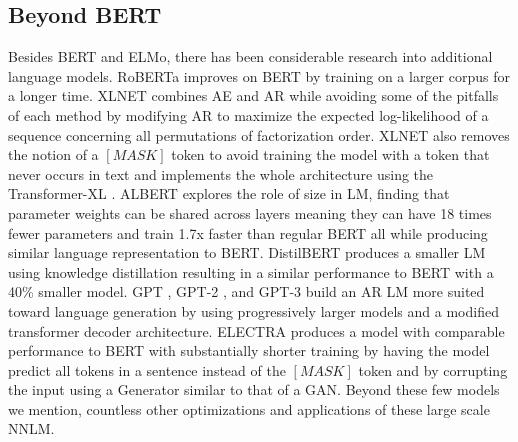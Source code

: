 \subsection{Beyond BERT}
\label{chap:prior:sec:lm:otherlm}
Besides BERT and ELMo, there has been considerable research into additional language models. RoBERTa \cite{Liu2019RoBERTaAR} improves on BERT by training on a larger corpus for a longer time. XLNET \cite{Yang2019XLNetGA} combines AE and AR while avoiding some of the pitfalls of each method by modifying AR to maximize the expected log-likelihood of a sequence concerning all permutations of factorization order. XLNET also removes the notion of a $[MASK]$ token to avoid training the model with a token that never occurs in text and implements the whole architecture using the Transformer-XL \cite{Dai2019TransformerXLAL}. ALBERT \cite{Lan2019ALBERTAL} explores the role of size in LM, finding that parameter weights can be shared across layers meaning they can have 18 times fewer parameters and train 1.7x faster than regular BERT all while producing similar language representation to BERT. DistilBERT \cite{Sanh2019DistilBERTAD} produces a smaller LM using knowledge distillation resulting in a similar performance to BERT with a 40\% smaller model. GPT \cite{Radford2018ImprovingLU}, GPT-2 \cite{Radford2019LanguageMA}, and GPT-3 \cite{Brown2020LanguageMA}  build an AR LM more suited toward language generation by using progressively larger models and a modified transformer decoder architecture. ELECTRA \cite{Clark2020ELECTRAPT} produces a model with comparable performance to BERT with substantially shorter training by having the model predict all tokens in a sentence instead of the $[MASK]$ token and by corrupting the input using a Generator similar to that of a GAN. Beyond these few models we mention, countless other optimizations and applications of these large scale NNLM. 
